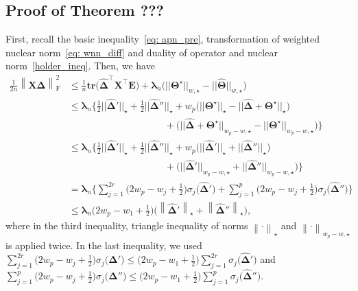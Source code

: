 \documentclass[alpha-refs]{wiley-article}
\begin{document}
\subsection{Proof of Theorem ???}
\label{pf_thm_3_2}
First, recall the basic inequality~\eqref{eq: apn_pre}, transformation of weighted nuclear norm~\eqref{eq: wnn_diff} and duality of operator and nuclear norm~\eqref{holder_ineq}.
Then, we have
\begin{align}
    \frac{1}{2n} \left\| \boldsymbol{X} \boldsymbol{\widehat{\Delta}} \right\|_{\text{F}}^{2}
    &\leq \frac{1}{n} \textbf{tr}\big( \boldsymbol{\widehat{\Delta}}^{\top} \boldsymbol{X}^{\top}\boldsymbol{E} \big) +
    \boldsymbol{\lambda}_{n} \big( ||\boldsymbol{\Theta^{\star}}||_{w,\star} - ||\widehat{\boldsymbol{\Theta}}||_{w,\star} \big) \nonumber \\
    &\leq \boldsymbol{\lambda}_{n}\bigg\{ \frac{1}{2}||\boldsymbol{\widehat{\Delta}}'||_{\star}
    + \frac{1}{2}||\boldsymbol{\widehat{\Delta}}''||_{\star}
    + w_{p}\big( ||\boldsymbol{\Theta^{\star}}||_{\star} - ||\boldsymbol{\widehat{\Delta}}  + \boldsymbol{\Theta^{\star}}||_{\star} \big) \nonumber \\
    &\qquad \qquad \qquad \qquad \qquad + \big( ||\boldsymbol{\widehat{\Delta}} + \boldsymbol{\Theta^{\star}}||_{w_{p}-w,\star} - ||\boldsymbol{\Theta^{\star}}||_{w_{p}-w,\star}\big)\bigg\} \nonumber \\
    &\leq \boldsymbol{\lambda}_{n}\bigg\{ \frac{1}{2}||\boldsymbol{\widehat{\Delta}}'||_{\star}
    + \frac{1}{2}||\boldsymbol{\widehat{\Delta}}''||_{\star}
    + w_{p}\big( ||\boldsymbol{\widehat{\Delta}}'||_{\star} + ||\boldsymbol{\widehat{\Delta}}''||_{\star} \big) \nonumber \\
    &\qquad \qquad \qquad \qquad \qquad + \big( ||\boldsymbol{\widehat{\Delta}}'||_{w_{p}-w,\star} + ||\boldsymbol{\widehat{\Delta}}''||_{w_{p}-w,\star}\big)\bigg\} \nonumber \\
    &=\boldsymbol{\lambda}_{n}\bigg\{ \sum_{j=1}^{2r}\bigg(2w_{p}-w_{j}+\frac{1}{2}\bigg)\sigma_{j}\big(\boldsymbol{\widehat{\Delta}}'\big) + \sum_{j=1}^{p}\bigg(2w_{p}-w_{j}+\frac{1}{2}\bigg)\sigma_{j}\big(\boldsymbol{\widehat{\Delta}}''\big)\bigg\} \nonumber \\
    &\leq \boldsymbol{\lambda}_{n} \bigg( 2w_{p}-w_{1}+\frac{1}{2} \bigg)
    \bigg( \left\|\boldsymbol{\widehat{\Delta}}'\right\|_{\star} + \left\|\boldsymbol{\widehat{\Delta}}'' \right\|_{\star} \bigg),  \label{eq: basic}
\end{align}
where in the third inequality, triangle inequality of norms $\left\| \cdot \right\|_{\star}$ and $\left\| \cdot \right\|_{w_{p}-w,\star}$ is applied twice.
In the last inequality, we used
$\sum_{j=1}^{2r}\big(2w_{p}-w_{j}+\frac{1}{2}\big)\sigma_{j}\big(\boldsymbol{\widehat{\Delta}}'\big)\leq \big(2w_{p}-w_{1}+\frac{1}{2}\big) \sum_{j=1}^{2r}\sigma_{j}\big(\boldsymbol{\widehat{\Delta}}'\big)$ and
$\sum_{j=1}^{p}\big(2w_{p}-w_{j}+\frac{1}{2}\big)\sigma_{j}\big(\boldsymbol{\widehat{\Delta}}''\big)\leq \big(2w_{p}-w_{1}+\frac{1}{2}\big) \sum_{j=1}^{p}\sigma_{j}\big(\boldsymbol{\widehat{\Delta}}''\big)$.
\end{document}
